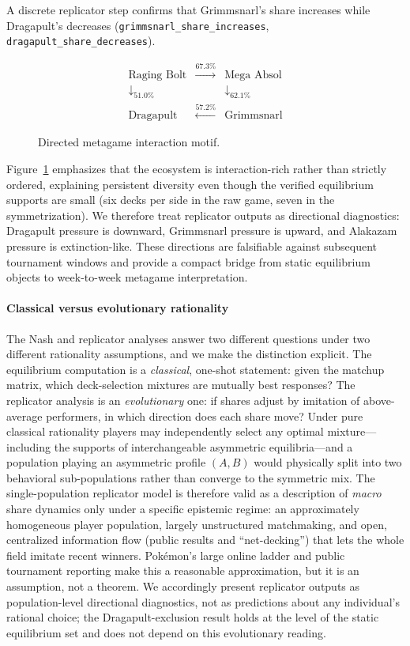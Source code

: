 \documentclass[journal]{IEEEtran}
\newif\ifhighlightchanges
\newcommand{\revised}[1]{\ifhighlightchanges\textcolor{blue!70!black}{#1}\else#1\fi}
\begin{document}
A discrete replicator step confirms that Grimmsnarl's share increases while Dragapult's decreases (\texttt{grimmsnarl\_share\_increases}, \texttt{dragapult\_share\_decreases}).

\begin{figure}[!t]
\centering
\[
\begin{array}{ccc}
\text{Raging Bolt} & \xrightarrow{67.3\%} & \text{Mega Absol} \\
\downarrow_{51.0\%} & & \downarrow_{62.1\%} \\
\text{Dragapult} & \xleftarrow{57.2\%} & \text{Grimmsnarl}
\end{array}
\]
\caption{Directed metagame interaction motif.}
\label{fig:cycle}
\end{figure}

Figure~\ref{fig:cycle} emphasizes that the ecosystem is interaction-rich rather than strictly ordered, explaining persistent diversity even though the verified equilibrium supports are small (six decks per side in the raw game, seven in the symmetrization).
We therefore treat replicator outputs as directional diagnostics: Dragapult pressure is downward, Grimmsnarl pressure is upward, and Alakazam pressure is extinction-like.
These directions are falsifiable against subsequent tournament windows and provide a compact bridge from static equilibrium objects to week-to-week metagame interpretation.

\paragraph{\revised{Classical versus evolutionary rationality}}
\revised{The Nash and replicator analyses answer two different questions under two different rationality assumptions, and we make the distinction explicit.
The equilibrium computation is a \emph{classical}, one-shot statement: given the matchup matrix, which deck-selection mixtures are mutually best responses?
The replicator analysis is an \emph{evolutionary} one: if shares adjust by imitation of above-average performers, in which direction does each share move?
Under pure classical rationality players may independently select any optimal mixture---including the supports of interchangeable asymmetric equilibria---and a population playing an asymmetric profile $(A,B)$ would physically split into two behavioral sub-populations rather than converge to the symmetric mix.
The single-population replicator model is therefore valid as a description of \emph{macro} share dynamics only under a specific epistemic regime: an approximately homogeneous player population, largely unstructured matchmaking, and open, centralized information flow (public results and ``net-decking'') that lets the whole field imitate recent winners.
Pokémon's large online ladder and public tournament reporting make this a reasonable approximation, but it is an assumption, not a theorem.
We accordingly present replicator outputs as population-level directional diagnostics, not as predictions about any individual's rational choice; the Dragapult-exclusion result holds at the level of the static equilibrium set and does not depend on this evolutionary reading.}
\end{document}

